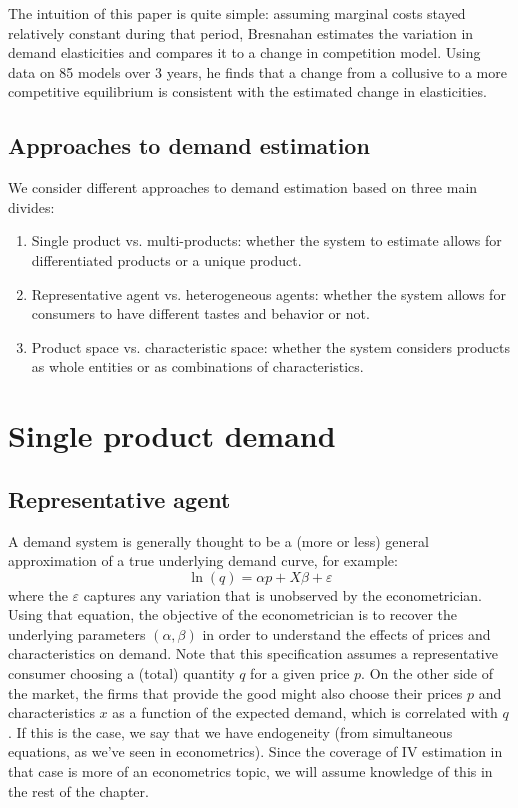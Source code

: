The intuition of this paper is quite simple: assuming marginal costs stayed relatively constant during that period, Bresnahan estimates the variation in demand elasticities and compares it to a change in competition model. Using data on 85 models over 3 years, he finds that a change from a collusive to a more competitive equilibrium is consistent with the estimated change in elasticities.

\subsection{Approaches to demand estimation}

We consider different approaches to demand estimation based on three main divides:\begin{enumerate}
\item Single product vs. multi-products: whether the system to estimate allows for differentiated products or a unique product.
\item Representative agent vs. heterogeneous agents: whether the system allows for consumers to have different tastes and behavior or not.
\item Product space vs. characteristic space: whether the system considers products as whole entities or as combinations of characteristics.
\end{enumerate}

\section{Single product demand}

\subsection{Representative agent}

A demand system is generally thought to be a (more or less) general approximation of a true underlying demand curve, for example: $$\ln(q) = \alpha p + X\beta + \varepsilon $$ where the $\varepsilon$ captures any variation that is unobserved by the econometrician. Using that equation, the objective of the econometrician is to recover the underlying parameters $(\alpha, \beta)$ in order to understand the effects of prices and characteristics on demand. Note that this specification assumes a representative consumer choosing a (total) quantity $q$ for a given price $p$. On the other side of the market, the firms that provide the good might also choose their prices $p$ and characteristics $x$ as a function of the expected demand, which is correlated with $q$. If this is the case, we say that we have endogeneity (from simultaneous equations, as we've seen in econometrics). Since the coverage of IV estimation in that case is more of an econometrics topic, we will assume knowledge of this in the rest of the chapter.

